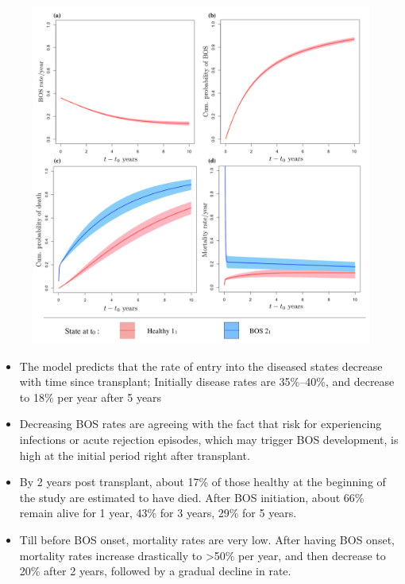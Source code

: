 \documentclass{beamer}
\begin{document}
\begin{frame}
\begin{figure}[t!]
\centering
\includegraphics[scale=0.3]{4plots4.pdf}
\end{figure}
\end{frame}
\begin{frame}
\begin{itemize}
\item The model predicts that the rate of entry into the diseased states decrease with time since transplant; Initially disease rates are 35\%–40\%, and decrease to 18\% per year after 5 years
\vspace{5mm}
\item Decreasing BOS rates are agreeing with the fact that risk for experiencing infections or acute rejection episodes, which may trigger BOS development, is high at the initial period right after transplant.
\end{itemize}
\end{frame}
\begin{frame}
\begin{itemize}
\item By 2 years post transplant, about 17\% of those healthy at the beginning of the study are estimated to have died. After BOS initiation, about 66\% remain alive for 1 year, 43\% for 3 years, 29\% for 5 years.
\vspace{5mm}
\item Till before BOS onset, mortality rates are very low. After having BOS onset, mortality rates increase drastically to >50\% per year, and then decrease to 20\% after 2 years, followed by a gradual decline in rate.
\end{itemize}
\end{frame}
\end{document}

